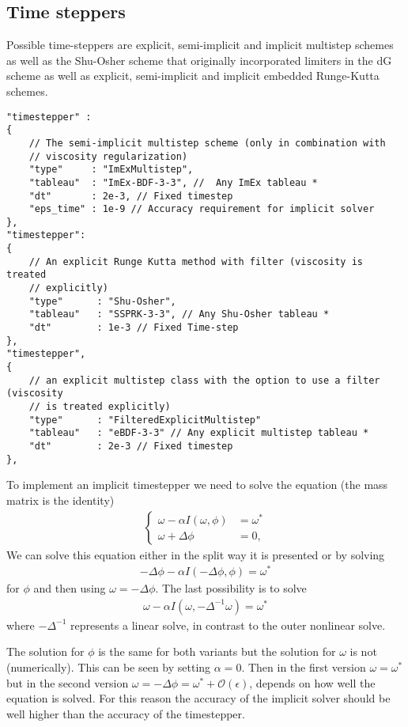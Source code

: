 \subsection{Time steppers}
Possible time-steppers are explicit, semi-implicit and implicit multistep schemes
as well as the Shu-Osher scheme that originally incorporated limiters in the dG scheme
as well as explicit, semi-implicit and implicit embedded Runge-Kutta schemes.
\begin{verbatim}
"timestepper" :
{
    // The semi-implicit multistep scheme (only in combination with
    // viscosity regularization)
    "type"     : "ImExMultistep",
    "tableau"  : "ImEx-BDF-3-3", //  Any ImEx tableau *
    "dt"       : 2e-3, // Fixed timestep
    "eps_time" : 1e-9 // Accuracy requirement for implicit solver
},
"timestepper":
{
    // An explicit Runge Kutta method with filter (viscosity is treated
    // explicitly)
    "type"      : "Shu-Osher",
    "tableau"   : "SSPRK-3-3", // Any Shu-Osher tableau *
    "dt"        : 1e-3 // Fixed Time-step
},
"timestepper",
{
    // an explicit multistep class with the option to use a filter (viscosity
    // is treated explicitly)
    "type"      : "FilteredExplicitMultistep"
    "tableau"   : "eBDF-3-3" // Any explicit multistep tableau *
    "dt"        : 2e-3 // Fixed timestep
},
\end{verbatim}
To implement an implicit timestepper we need to solve the equation (the mass matrix is the identity)
\begin{align}\label{eq:split}
    \begin{cases}
        \omega - \alpha I(\omega, \phi) &= \omega^*  \\
        \omega+\Delta\phi &= 0,
    \end{cases}
\end{align}
We can solve this equation either in the split way it is presented or by solving
\begin{align} \label{eq:single}
    -\Delta\phi - \alpha I(-\Delta\phi, \phi) = \omega^*
\end{align}
for $\phi$ and then using $\omega = -\Delta\phi$.
The last possibility is to solve
\begin{align} \label{eq:omega}
    \omega - \alpha I ( \omega, -\Delta^{-1} \omega) = \omega^*
\end{align}
where $-\Delta^{-1}$ represents a linear solve, in contrast to the outer nonlinear solve.

The solution for $\phi$ is the same for both variants but the solution for
$\omega$ is not (numerically). This can be seen by setting $\alpha=0$. Then in
the first version $\omega=\omega^*$ but in the second version
$\omega=-\Delta\phi = \omega^* + \mathcal O(\epsilon)$, depends on how well the
equation is solved. For this reason the accuracy of the implicit solver should
be well higher than the accuracy of the timestepper.

